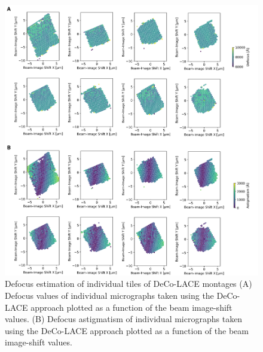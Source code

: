 \documentclass[
]{article}
\newenvironment{fignos:tagged-figure}[1][]{
    \let\oldthefigure\thefigure
    \let\oldtheHfigure\theHfigure
    \renewcommand{\thefigure}{#1}
    \renewcommand{\theHfigure}{#1}
  }{
    \let\thefigure\oldthefigure
    \let\theHfigure\oldtheHfigure
    \addtocounter{figure}{-1}
  }
\begin{document}
\begin{fignos:tagged-figure}

\begin{figure}
\hypertarget{fig:lamella_spatial_info}{%
\centering
\includegraphics{figures/lamella_spatial_info.png}
\caption{Defocus estimation of individual tiles of DeCo-LACE montages
(A) Defocus values of individual micrographs taken using the DeCo-LACE approach
plotted as a function of the beam image-shift values.
(B) Defocus astigmatism of individual micrographs taken using the DeCo-LACE approach
plotted as a function of the beam image-shift values.}\label{fig:lamella_spatial_info}
}
\end{figure}

\end{fignos:tagged-figure}
\end{document}
